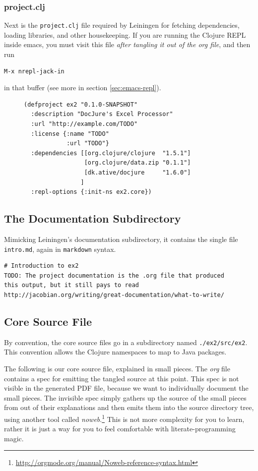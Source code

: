 \documentclass[11pt]{article}
\begin{document}
\subsubsection{project.clj}
\label{sec-2-1-3}
Next is the \verb+project.clj+ file required by Leiningen for fetching
dependencies, loading libraries, and other housekeeping. If you are
running the Clojure REPL inside emacs, you must visit this file \emph{after
tangling it out of the org file}, and then run
\begin{verbatim}
M-x nrepl-jack-in
\end{verbatim}
in that buffer (see more in section
\ref{sec:emacs-repl}).
\begin{figure}[H]
\label{project-file}
\begin{verbatim}
(defproject ex2 "0.1.0-SNAPSHOT"
  :description "DocJure's Excel Processor"
  :url "http://example.com/TODO"
  :license {:name "TODO"
            :url "TODO"}
  :dependencies [[org.clojure/clojure  "1.5.1"]
                 [org.clojure/data.zip "0.1.1"]
                 [dk.ative/docjure     "1.6.0"]
                ]
  :repl-options {:init-ns ex2.core})
\end{verbatim}
\end{figure}
\subsection{The Documentation Subdirectory}
\label{sec-2-2}
Mimicking Leiningen's documentation subdirectory, it contains the
single file \verb+intro.md+, again in \verb+markdown+ syntax.
\begin{verbatim}
# Introduction to ex2
TODO: The project documentation is the .org file that produced
this output, but it still pays to read
http://jacobian.org/writing/great-documentation/what-to-write/
\end{verbatim}

\subsection{Core Source File}
\label{sec-2-3}
By convention, the core source files go in a subdirectory named
\verb+./ex2/src/ex2+. This convention allows the Clojure namespaces
to map to Java packages.

The following is our core source file, explained in small pieces.
The \emph{org} file contains a spec for emitting the tangled source at
this point. This spec is not visible in the generated PDF file,
because we want to individually document the small pieces. The
invisible spec simply gathers up the source of the small pieces from
out of their explanations and then emits them into the source
directory tree, using another tool called
\emph{noweb}.\footnote{\url{http://orgmode.org/manual/Noweb-reference-syntax.html}}
This is not more complexity for you to learn, rather it is just a
way for you to feel comfortable with literate-programming magic.
\end{document}
